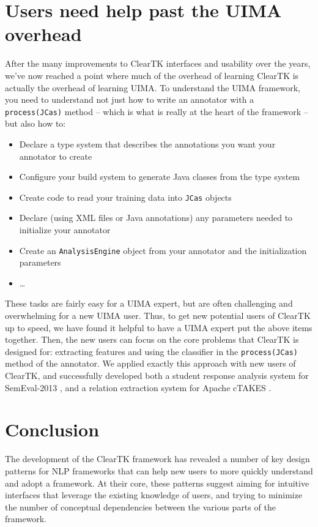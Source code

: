 \documentclass[10pt, a4paper]{article}
\newcommand{\code}[1]{\texttt{\small #1}}
\begin{document}
\section{Users need help past the UIMA overhead}
After the many improvements to ClearTK interfaces and usability over the years, we've now reached a point where much of the overhead of learning ClearTK is actually the overhead of learning UIMA.
To understand the UIMA framework, you need to understand not just how to write an annotator with a \code{process(JCas)} method -- which is what is really at the heart of the framework -- but also how to:
\begin{itemize}
\item Declare a type system that describes the annotations you want your annotator to create
\item Configure your build system to generate Java classes from the type system
\item Create code to read your training data into \code{JCas} objects
\item Declare (using XML files or Java annotations) any parameters needed to initialize your annotator
\item Create an \code{AnalysisEngine} object from your annotator and the initialization parameters
\item \ldots
\end{itemize}
These tasks are fairly easy for a UIMA expert, but are often challenging and overwhelming for a new UIMA user.
Thus, to get new potential users of ClearTK up to speed, we have found it helpful to have a UIMA expert put the above items together.
Then, the new users can focus on the core problems that ClearTK is designed for: extracting features and using the classifier in the \code{process(JCas)} method of the annotator.
We applied exactly this approach with new users of ClearTK, and successfully developed both a student response analysis system for SemEval-2013 \cite{okoye-bethard-sumner:2013:SemEval-2013}, and a relation extraction system for Apache cTAKES \cite{dligach2013discovering}.

\section{Conclusion}
The development of the ClearTK framework has revealed a number of key design patterns for NLP frameworks that can help new users to more quickly understand and adopt a framework.
At their core, these patterns suggest aiming for intuitive interfaces that leverage the existing knowledge of users, and trying to minimize the number of conceptual dependencies between the various parts of the framework.



\end{document}

